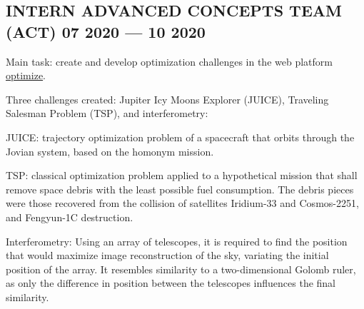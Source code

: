 \documentclass[letter,10pt]{article}
\begin{document}
\subsection{{INTERN ADVANCED CONCEPTS TEAM (ACT) \hfill 07 2020  --- 10 2020}}
\begin{zitemize}
\item Main task: create and develop optimization challenges in the web platform \href{https://optimize.esa.int/}{optimize}.
\item Three challenges created: Jupiter Icy Moons Explorer (JUICE), Traveling Salesman Problem (TSP), and interferometry: \begin{zitemize}
    \item JUICE: trajectory optimization problem of a spacecraft that orbits through the Jovian system, based on the homonym  mission.
    \item TSP: classical optimization problem applied to a hypothetical mission that shall remove space debris with the least possible fuel consumption. The debris pieces were those recovered from the collision of satellites Iridium-33  and Cosmos-2251, and Fengyun-1C destruction.
    \item Interferometry: Using an array of telescopes, it is required to find the position that would maximize image reconstruction of the sky, variating the initial position of the array. It resembles similarity to a two-dimensional Golomb ruler, as only the difference in position between the telescopes influences the final similarity.
\end{zitemize}

\end{zitemize}

\end{document}
